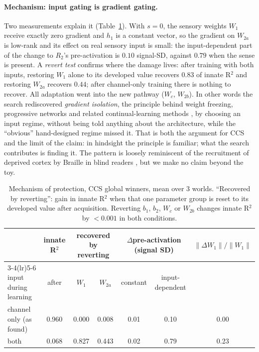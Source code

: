 \documentclass[11pt]{article}
\begin{document}
\paragraph{Mechanism: input gating is gradient gating.} Two measurements explain it
(Table~\ref{tab:mech}). With $s=0$, the sensory weights $W_1$ receive exactly zero gradient and
$h_1$ is a constant vector, so the gradient on $W_{2a}$ is low-rank and its effect on real
sensory input is small: the input-dependent part of the change to $R_2$'s pre-activation is
$0.10$ signal-SD, against $0.79$ when the sense is present. A \emph{revert test} confirms where the
damage lives: after training with both inputs, restoring $W_1$ alone to its developed value
recovers $0.83$ of innate R$^2$ and restoring $W_{2a}$ recovers $0.44$; after channel-only
training there is nothing to recover. All adaptation went into the new pathway ($W_c$, $W_{2b}$).
In other words the search rediscovered \emph{gradient isolation}, the principle behind weight
freezing, progressive networks and related continual-learning methods
\cite{kirkpatrick2017}, by choosing an input regime, without being told anything about the
architecture, while the ``obvious'' hand-designed regime missed it. That is both the argument for
CCS and the limit of the claim: in hindsight the principle is familiar; what the search
contributes is finding it. The pattern is loosely reminiscent of the recruitment of deprived
cortex by Braille in blind readers \cite{sadato1996}, but we make no claim beyond the toy.

\begin{table}[t]
\centering\small
\begin{tabular}{lcccccc}
\toprule
& innate R$^2$ & \multicolumn{2}{c}{recovered by reverting} & \multicolumn{2}{c}{$\Delta$pre-activation (signal SD)} & $\|\Delta W_1\|/\|W_1\|$\\
\cmidrule(lr){3-4}\cmidrule(lr){5-6}
input during learning & after & $W_1$ & $W_{2a}$ & constant & input-dependent & \\
\midrule
channel only (as found) & 0.960 & 0.000 & 0.008 & 0.01 & 0.10 & 0.00\\
both & 0.068 & 0.827 & 0.443 & 0.02 & 0.79 & 0.23\\
\bottomrule
\end{tabular}
\caption{Mechanism of protection, CCS global winners, mean over 3 worlds. ``Recovered by
reverting'': gain in innate R$^2$ when that one parameter group is reset to its developed value
after acquisition. Reverting $b_1$, $b_2$, $W_c$ or $W_{2b}$ changes innate R$^2$ by $<0.001$ in
both conditions.}
\label{tab:mech}
\end{table}
\end{document}
